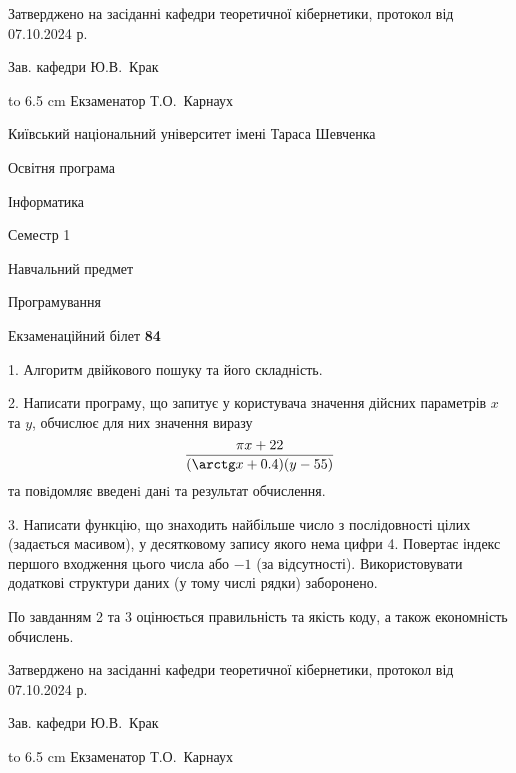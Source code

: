 \documentclass[12pt, ukrainian]{article}
\begin{document}
{\smallskip\smallskip \begin {scriptsize} Затверджено на засіданні кафедри теоретичної кібернетики, протокол   від   07.10.2024 р.\par\smallskip\smallskip\smallskip\smallskip
{\parbox {6.5 cm} {Зав. кафедри \dotfill Ю.В.~Крак}}\hspace {0.7cm} {\hbox to 6.5 cm { Екзаменатор \dotfill Т.О.~Карнаух}} \end{scriptsize}}
\vspace{0.9cm}
{{\begin {scriptsize}\par
{ \center  Київський національний університет імені Тараса Шевченка \par}
{\parbox {5 cm}{Освітня програма \hfill}{\parbox {7 cm}{Інформатика\hfill}}\parbox {6 cm}{\hfill Семестр 1}}\par
{\parbox {5 cm} {Навчальний предмет \hfill}\parbox {7 cm}{Програмування \hfill}\parbox {6cm}{\hfill}\par}\vspace{-15pt} \end{scriptsize}}{\center Екзаменаційний білет \No \textbf { 84 }\par}}
{%
1. Алгоритм двійкового пошуку та його складність.%
\par
2. Написати програму, що запитує у користувача значення дійсних параметрів $x$ та $y$, обчислює для них значення виразу 
$$\frac{\pi x + 22}{(\arctg x + 0.4) (y - 55)}$$ 
та повiдомляє введенi данi та результат обчислення.

\par
3. Написати функцію, що знаходить найбільше число з послідовності цілих (задається масивом), у десятковому запису якого нема цифри 4. Повертає індекс першого входження цього числа або $-1$ (за відсутності). Використовувати додаткові структури даних (у тому числі рядки) заборонено.

По завданням 2 та 3 оцінюється правильність та якість коду, а також економність обчислень.

}
{\smallskip\smallskip \begin {scriptsize} Затверджено на засіданні кафедри теоретичної кібернетики, протокол   від   07.10.2024 р.\par\smallskip\smallskip\smallskip\smallskip
{\parbox {6.5 cm} {Зав. кафедри \dotfill Ю.В.~Крак}}\hspace {0.7cm} {\hbox to 6.5 cm { Екзаменатор \dotfill Т.О.~Карнаух}} \end{scriptsize}}
\end{document}
